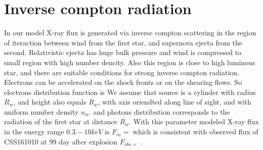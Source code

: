 \documentclass[a4paper,12pt]{extreport}
\begin{document}
\section{Inverse compton radiation}\label{compton}

In our model X-ray flux is generated via inverse compton scattering in the region of iteraction between wind from the first star, and supernova ejecta from the second. Relativistic ejecta has huge bulk pressure and wind is compressed to small region with high number dencity. Also this region is close to high luminous star, and there are suitable conditions for strong inverse compton radiation. Electrons can be accelerated on the shock fronts or on the shearing flows. So electrons distribution function is 
We assume that source is a cylinder with radius $R_w$, and height also equals $R_w$, with axis oriendted along line of sight, and with uniform number density $n_w$. 
and photons distribution corresponds to the radiation of the first star at distance $R_w$. With this parameter modeled X-ray flux in the energy range $0.3-10 keV$ is $F_m = $ which is consistent with observed flux of CSS161010 at 99 day after explosion $F_{obs = }$ \cite{Coppejans2020}.



\end{document}
